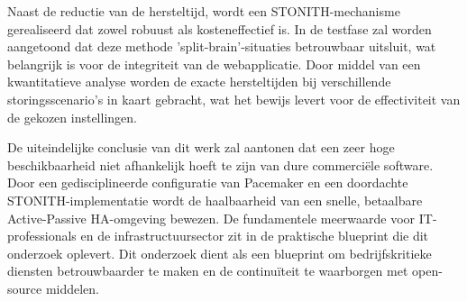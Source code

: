 \begin{table}[h]
    \centering
    \caption{Verwachte RTO-metingen bij geoptimaliseerde configuratie. \autocite{JWBSystems}, \autocite{OracleC}}
    \label{tab:verwachte_rto}
\end{table}
\medskip

Naast de reductie van de hersteltijd, wordt een STONITH-mechanisme gerealiseerd dat zowel robuust als kosteneffectief is. In de testfase zal worden aangetoond dat deze methode 'split-brain'-situaties betrouwbaar uitsluit, wat belangrijk is voor de integriteit van de webapplicatie. Door middel van een kwantitatieve analyse worden de exacte hersteltijden bij verschillende storingsscenario's in kaart gebracht, wat het bewijs levert voor de effectiviteit van de gekozen instellingen.
\medskip

De uiteindelijke conclusie van dit werk zal aantonen dat een zeer hoge beschikbaarheid niet afhankelijk hoeft te zijn van dure commerciële software. Door een gedisciplineerde configuratie van Pacemaker en een doordachte STONITH-implementatie wordt de haalbaarheid van een snelle, betaalbare Active-Passive HA-omgeving bewezen. De fundamentele meerwaarde voor IT-professionals en de infrastructuursector zit in de praktische blueprint die dit onderzoek oplevert. Dit onderzoek dient als een blueprint om bedrijfskritieke diensten betrouwbaarder te maken en de continuïteit te waarborgen met open-source middelen.

\autocite{Clusterlabs2024}

